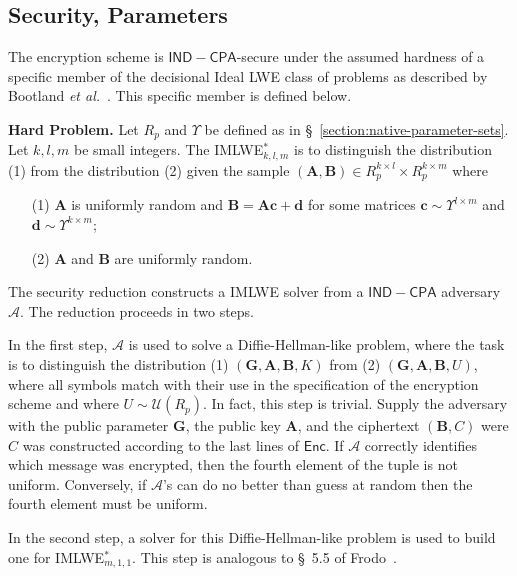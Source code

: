 \subsection{Security, Parameters}
\label{section:security-parameters}

The encryption scheme is $\mathsf{IND-CPA}$-secure under the  assumed hardness of a specific member of the decisional Ideal LWE class of problems as described by Bootland \emph{et al.}~\cite{BootlandCSV21}. This specific member is defined below.

\vspace{0.25cm}

\textbf{Hard Problem.} Let $R_p$ and $\Upsilon$ be defined as in \S~\ref{section:native-parameter-sets}. Let $k, l, m$ be small integers. The IMLWE$^*_{k,l,m}$ is to distinguish the distribution (1) from the distribution (2) given the sample $(\mathbf{A}, \mathbf{B}) \in R_p^{k \times l} \times R_p^{k \times m}$ where
\begin{itemize}
\item[(1)] $\mathbf{A}$ is uniformly random and $\mathbf{B} = \mathbf{A} \mathbf{c} + \mathbf{d}$ for some matrices $\mathbf{c} \sim \Upsilon^{l \times m}$ and $\mathbf{d} \sim \Upsilon^{k \times m}$;
\item[(2)] $\mathbf{A}$ and $\mathbf{B}$ are uniformly random.
\end{itemize}

\vspace{0.25cm}

The security reduction constructs a IMLWE solver from a $\mathsf{IND-CPA}$ adversary $\mathcal{A}$. The reduction proceeds in two steps.

In the first step, $\mathcal{A}$ is used to solve a Diffie-Hellman-like problem, where the task is to distinguish the distribution (1) $(\mathbf{G}, \mathbf{A}, \mathbf{B}, K)$ from (2) $(\mathbf{G}, \mathbf{A}, \mathbf{B}, U)$, where all symbols match with their use in the specification of the encryption scheme and where $U \sim \mathcal{U}(R_p)$. In fact, this step is trivial. Supply the adversary with the public parameter $\mathbf{G}$, the public key $\mathbf{A}$, and the ciphertext $(\mathbf{B}, C)$ were $C$ was constructed according to the last lines of $\mathsf{Enc}$. If $\mathcal{A}$ correctly identifies which message was encrypted, then the fourth element of the tuple is not uniform. Conversely, if $\mathcal{A}$'s can do no better than guess at random then the fourth element must be uniform.

In the second step, a solver for this Diffie-Hellman-like problem is used to build one for IMLWE$^*_{m, 1, 1}$. This step is analogous to \S~5.5 of Frodo~\cite{frodo}.

